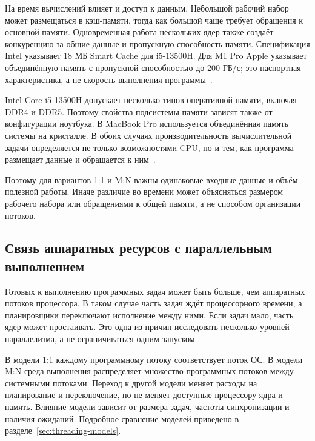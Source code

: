 На время вычислений влияет и доступ к данным. Небольшой рабочий набор может размещаться в
  кэш-памяти, тогда как большой чаще требует обращения к основной памяти. Одновременная работа
  нескольких ядер также создаёт конкуренцию за общие данные и пропускную способность памяти.
  Спецификация Intel указывает 18 МБ Smart Cache для i5-13500H. Для M1 Pro Apple указывает
  объединённую память с пропускной способностью до 200 ГБ/с; это паспортная характеристика, а не
  скорость выполнения программы~\cite{intel_i513500h,apple_m1pro_specs}.

Intel Core i5-13500H допускает несколько типов оперативной памяти, включая DDR4 и DDR5.
  Поэтому свойства подсистемы памяти зависят также от конфигурации ноутбука. В MacBook Pro
  используется объединённая память системы на кристалле. В обоих случаях производительность
  вычислительной задачи определяется не только возможностями CPU, но и тем, как программа
  размещает данные и обращается к ним~\cite{intel_i513500h,apple_m1pro_specs}.

Поэтому для вариантов 1:1 и M:N важны одинаковые входные данные и объём полезной работы. Иначе
  различие во времени может объясняться размером рабочего набора или обращениями к общей памяти,
  а не способом организации потоков.


\subsection{Связь аппаратных ресурсов с параллельным выполнением}
\label{subsec:parallel-hardware}

Готовых к выполнению программных задач может быть больше, чем аппаратных потоков процессора. В
  таком случае часть задач ждёт процессорного времени, а планировщики переключают исполнение между
  ними. Если задач мало, часть ядер может простаивать. Это одна из причин исследовать несколько
  уровней параллелизма, а не ограничиваться одним запуском.

В модели 1:1 каждому программному потоку соответствует поток ОС. В модели M:N среда выполнения
  распределяет множество программных потоков между системными потоками. Переход к другой модели
  меняет расходы на планирование и переключение, но не меняет доступные процессору ядра и память.
  Влияние модели зависит от размера задач, частоты синхронизации и наличия ожиданий. Подробное
  сравнение моделей приведено в разделе~\ref{sec:threading-models}.

